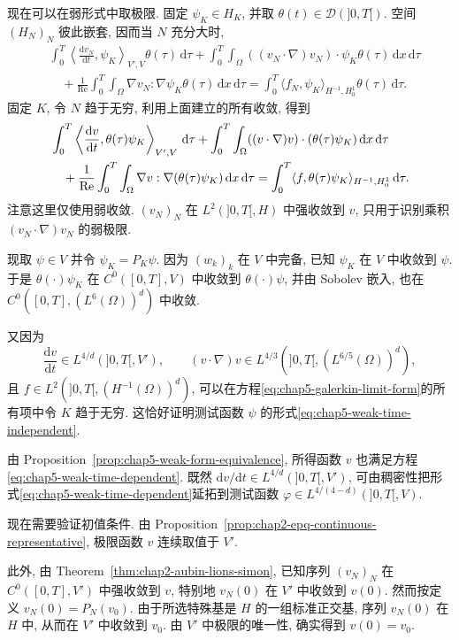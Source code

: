 现在可以在弱形式中取极限. 固定 $\psi_K\in H_K$, 并取 $\theta(t)\in\mathcal D(]0,T[)$. 空间 $(H_N)_N$ 彼此嵌套, 因而当 $N$ 充分大时,
\begin{align*}
 &\int_0^T\left\langle\frac{\mathrm dv_N}{\mathrm dt},\psi_K\right\rangle_{V',V}\theta(\tau)\,\mathrm d\tau
 +\int_0^T\int_\Omega((v_N\cdot\nabla)v_N)\cdot\psi_K\theta(\tau)\,\mathrm dx\,\mathrm d\tau\\
 &\quad+\frac1{\operatorname{Re}}\int_0^T\int_\Omega\nabla v_N:\nabla\psi_K\theta(\tau)\,\mathrm dx\,\mathrm d\tau
 =\int_0^T\langle f_N,\psi_K\rangle_{H^{-1},H_0^1}\theta(\tau)\,\mathrm d\tau.
\end{align*}
固定 $K$, 令 $N$ 趋于无穷, 利用上面建立的所有收敛, 得到
\begin{align}
 &\int_0^T\left\langle\frac{\mathrm dv}{\mathrm dt},\theta(\tau)\psi_K\right\rangle_{V',V}\,\mathrm d\tau
 +\int_0^T\int_\Omega((v\cdot\nabla)v)\cdot(\theta(\tau)\psi_K)\,\mathrm dx\,\mathrm d\tau\notag\\
 &\quad+\frac1{\operatorname{Re}}\int_0^T\int_\Omega\nabla v:\nabla(\theta(\tau)\psi_K)\,\mathrm dx\,\mathrm d\tau
 =\int_0^T\langle f,\theta(\tau)\psi_K\rangle_{H^{-1},H_0^1}\,\mathrm d\tau.
\label{eq:chap5-galerkin-limit-form}
\end{align}
注意这里仅使用弱收敛. $(v_N)_N$ 在 $L^2(]0,T[,H)$ 中强收敛到 $v$, 只用于识别乘积 $(v_N\cdot\nabla)v_N$ 的弱极限.

现取 $\psi\in V$ 并令 $\psi_K=P_K\psi$. 因为 $(w_k)_k$ 在 $V$ 中完备, 已知 $\psi_K$ 在 $V$ 中收敛到 $\psi$. 于是 $\theta(\cdot)\psi_K$ 在 $C^0([0,T],V)$ 中收敛到 $\theta(\cdot)\psi$, 并由 Sobolev 嵌入, 也在 $C^0([0,T],(L^6(\Omega))^d)$ 中收敛.

又因为
\[
 \frac{\mathrm dv}{\mathrm dt}\in L^{4/d}(]0,T[,V'),\qquad
 (v\cdot\nabla)v\in L^{4/3}(]0,T[,(L^{6/5}(\Omega))^d),
\]
且 $f\in L^2(]0,T[,(H^{-1}(\Omega))^d)$, 可以在方程\eqref{eq:chap5-galerkin-limit-form}的所有项中令 $K$ 趋于无穷. 这恰好证明测试函数 $\psi$ 的形式\eqref{eq:chap5-weak-time-independent}.

由 Proposition~\ref{prop:chap5-weak-form-equivalence}, 所得函数 $v$ 也满足方程\eqref{eq:chap5-weak-time-dependent}. 既然 $\mathrm dv/\mathrm dt\in L^{4/d}(]0,T[,V')$, 可由稠密性把形式\eqref{eq:chap5-weak-time-dependent}延拓到测试函数 $\varphi\in L^{4/(4-d)}(]0,T[,V)$.

现在需要验证初值条件. 由 Proposition~\ref{prop:chap2-epq-continuous-representative}, 极限函数 $v$ 连续取值于 $V'$.

此外, 由 Theorem~\ref{thm:chap2-aubin-lions-simon}, 已知序列 $(v_N)_N$ 在 $C^0([0,T],V')$ 中强收敛到 $v$, 特别地 $v_N(0)$ 在 $V'$ 中收敛到 $v(0)$. 然而按定义 $v_N(0)=P_N(v_0)$. 由于所选特殊基是 $H$ 的一组标准正交基, 序列 $v_N(0)$ 在 $H$ 中, 从而在 $V'$ 中收敛到 $v_0$. 由 $V'$ 中极限的唯一性, 确实得到 $v(0)=v_0$.

